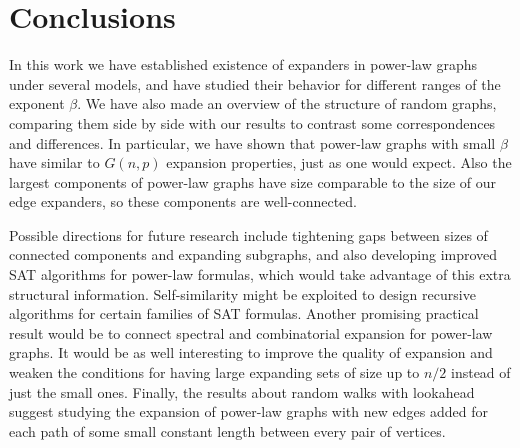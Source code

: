 \chapter{Conclusions}

In this work we have established existence of expanders
in power-law graphs under several models,
and have studied their behavior for different ranges of the exponent $\beta$.
We have also made an overview of the structure of random graphs,
comparing them side by side with our results
to contrast some correspondences and differences.
In particular, we have shown that power-law graphs with small $\beta$
have similar to $G(n,p)$ expansion properties, just as one would expect.
Also the largest components of power-law graphs have size comparable
to the size of our edge expanders, so these components are well-connected.

Possible directions for future research include tightening gaps
between sizes of connected components and expanding subgraphs,
and also developing improved SAT algorithms for power-law formulas,
which would take advantage of this extra structural information.
Self-similarity might be exploited to design recursive algorithms
for certain families of SAT formulas.
Another promising practical result would be
to connect spectral and combinatorial expansion for power-law graphs.
It would be as well interesting to improve the quality of expansion
and weaken the conditions for having large expanding sets of size up to $n/2$
instead of just the small ones.
Finally, the results about random walks with lookahead suggest studying
the expansion of power-law graphs with new edges added for each path
of some small constant length between every pair of vertices.
